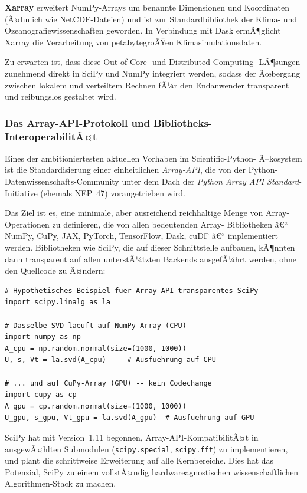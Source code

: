 \documentclass[12pt, a4paper]{article}
\begin{document}
\textbf{Xarray} erweitert NumPy-Arrays um benannte Dimensionen und
Koordinaten (Ã¤hnlich wie NetCDF-Dateien) und ist zur Standardbibliothek
der Klima- und Ozeanografiewissenschaften geworden. In Verbindung mit
Dask ermÃ¶glicht Xarray die Verarbeitung von petabytegroÃŸen Klimasimulationsdaten.

Zu erwarten ist, dass diese Out-of-Core- und Distributed-Computing-
LÃ¶sungen zunehmend direkt in SciPy und NumPy integriert werden, sodass
der Ãœbergang zwischen lokalem und verteiltem Rechnen fÃ¼r den Endanwender
transparent und reibungslos gestaltet wird.

\subsubsection{Das Array-API-Protokoll und Bibliotheks-InteroperabilitÃ¤t}
\label{subsubsec:array-api}

Eines der ambitioniertesten aktuellen Vorhaben im Scientific-Python-
Ã–kosystem ist die Standardisierung einer einheitlichen \emph{Array-API},
die von der Python-Datenwissenschafts-Community unter dem Dach der
\emph{Python Array API Standard}-Initiative (ehemals NEP~47) vorangetrieben
wird.

Das Ziel ist es, eine minimale, aber ausreichend reichhaltige Menge von
Array-Operationen zu definieren, die von allen bedeutenden Array-
Bibliotheken â€“ NumPy, CuPy, JAX, PyTorch, TensorFlow, Dask, cuDF â€“
implementiert werden. Bibliotheken wie SciPy, die auf dieser Schnittstelle
aufbauen, kÃ¶nnten dann transparent auf allen unterstÃ¼tzten Backends
ausgefÃ¼hrt werden, ohne den Quellcode zu Ã¤ndern:

\begin{lstlisting}[caption={Array-API-kompatible SciPy-Funktion (Zukunftsvision)}]
# Hypothetisches Beispiel fuer Array-API-transparentes SciPy
import scipy.linalg as la

# Dasselbe SVD laeuft auf NumPy-Array (CPU)
import numpy as np
A_cpu = np.random.normal(size=(1000, 1000))
U, s, Vt = la.svd(A_cpu)     # Ausfuehrung auf CPU

# ... und auf CuPy-Array (GPU) -- kein Codechange
import cupy as cp
A_gpu = cp.random.normal(size=(1000, 1000))
U_gpu, s_gpu, Vt_gpu = la.svd(A_gpu)  # Ausfuehrung auf GPU
\end{lstlisting}

SciPy hat mit Version~1.11 begonnen, Array-API-KompatibilitÃ¤t in
ausgewÃ¤hlten Submodulen (\texttt{scipy.special}, \texttt{scipy.fft})
zu implementieren, und plant die schrittweise Erweiterung auf alle
Kernbereiche. Dies hat das Potenzial, SciPy zu einem vollstÃ¤ndig
hardwareagnostischen wissenschaftlichen Algorithmen-Stack zu machen.
\end{document}
